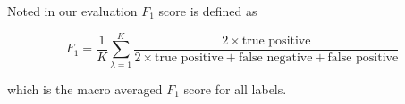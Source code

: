 Noted in our evaluation $F_1$ score is defined as 

\begin{equation}
F_1 = \frac{1}{K}\sum^K_{\lambda=1}{\frac
{2 \times \text{true positive}}
{2 \times \text{true positive} + \text{false negative} + \text{false positive}}}
\end{equation}

which is the macro averaged $F_1$ score for all labels.